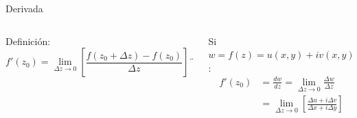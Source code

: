 \documentclass[9pt, aspectratio=169]{beamer}
\begin{document}
\begin{frame}{Derivada}
	\begin{columns}
		\begin{alertblock}{Definición:}
			\[ f'(z_0) = \lim_{\Delta z \rightarrow 0} \left[ \frac{f(z_0 + \Delta z) - f(z_0)}{\Delta z} \right] ¨ \]
		\end{alertblock} \pause
		\vspace{2em}

		Si $w = f(z) = u(x, y) + i v(x, y)$:
		\begin{align*}
			f'(z_0) & = \frac{dw}{dz} = \lim_{\Delta z \rightarrow 0} \frac{\Delta w}{\Delta z}                          \\
			        & = \lim_{\Delta z \rightarrow 0} \left[ \frac{\Delta u + i \Delta v}{\Delta x + i \Delta y} \right]
		\end{align*} \pause

		\includegraphics[width=0.9\textwidth]{figs/fig-04b.png}
	\end{columns}
\end{frame}
\end{document}
